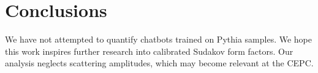 \section{Conclusions}\label{sec:conclusions}

We have not attempted to quantify chatbots trained on Pythia samples. We
hope this work inspires further research into calibrated Sudakov form
factors. Our analysis neglects scattering amplitudes, which may become
relevant at the CEPC.

